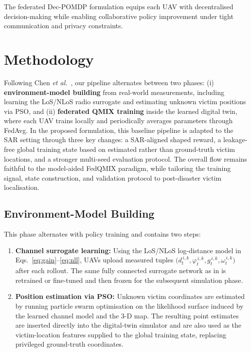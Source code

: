 \documentclass[drones,article,accept,pdftex,moreauthors]{Definitions/mdpi}
\begin{document}
The federated Dec-POMDP formulation equips each UAV with
decentralised decision-making while enabling collaborative policy improvement under
tight communication and privacy constraints.




\section{Methodology}\label{sec5}

Following Chen \emph{et al.}~\citep{chenModelAidedFederatedReinforcement2023}, our pipeline
alternates between two phases:
(i) \textbf{environment-model building} from real-world measurements, including
learning the LoS/NLoS radio surrogate and estimating unknown victim positions via PSO,
and (ii) \textbf{federated QMIX training} inside the learned digital twin, where each UAV
trains locally and periodically averages parameters through FedAvg.
In the proposed formulation, this baseline pipeline is adapted to the SAR setting through
three key changes: a SAR-aligned shaped reward, a leakage-free global training state based
on estimated rather than ground-truth victim locations, and a stronger multi-seed
evaluation protocol. The overall flow remains faithful to the model-aided FedQMIX paradigm,
while tailoring the training signal, state construction, and validation protocol to
post-disaster victim localisation.

\subsection{Environment-Model Building}\label{sec5_1}

This phase alternates with policy training and contains two steps:

\begin{enumerate}[label=(\roman*)]
    \item \textbf{Channel surrogate learning:}
    Using the LoS/NLoS log-distance model in Eqs.~\eqref{eq:gain}--\eqref{eq:nll},
    UAVs upload measured tuples
    $\big(d_t^{\,i,k},\varphi_t^{\,i,k},g_t^{\,i,k},\omega_t^{\,i,k}\big)$
    after each rollout. The same fully connected surrogate network as in
    \citet{esrafilianModelAidedDeepReinforcement2021} is retrained or fine-tuned
    and then frozen for the subsequent simulation phase.

    \item \textbf{Position estimation via PSO:}
    Unknown victim coordinates are estimated by running particle swarm optimisation
    on the likelihood surface induced by the learned channel model and the 3-D map.
    The resulting point estimates are inserted directly into the digital-twin simulator
    and are also used as the victim-location features supplied to the global training
    state, replacing privileged ground-truth coordinates.
\end{enumerate}
\end{document}
